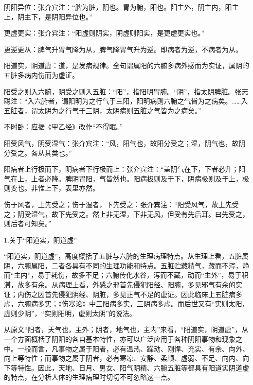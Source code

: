\documentclass[12pt]{ctexbook}
\begin{document}

\begin{jiaozhu}
	\item 阴阳异位：张介宾注：“脾为脏，阴也。胃为腑，阳也。阳主外，阴主内，阳主上，阴主下，是阴阳异位也。”
	\item 更虚更实：张介宾注：“阳虚则阴实，阴虚则阳实，是更虚更实也。”
	\item 更逆更从：脾气升胃气降为从，脾气降胃气升为逆。即病者为逆，不病者为从。
	\item 阳道实，阴道虚：道，是发病规律。全句谓属阳的六腑多病外感而为实证，属阴的五脏多病内伤而为虚证。
	\item 阳受之则入六腑，阴受之则入五脏：“阳”，指阳明胃腑。“阴”，指太阴脾脏。张志聪注：“入六腑者，谓阳明为之行气于三阳，阳明病则六腑之气皆为之病矣。……入五脏者，谓太阴为之行气于三阴，太阴病则五脏之气皆为之病矣。”
	\item 不时卧：应据《甲乙经》改作“不得眠。”
	\item 阳受风气，阴受湿气：张介宾注：“风，阳气也，故阳分受之；湿，阴气也，故阴分受之。各从其类也。”
	\item 阳病者上行极而下，阴病者下行极而上：张介宾注：“盖阴气在下，下者必升；阳气在上，上者必降。脾阴胃阳，气皆然也。阳病极则及于下，阴病极则及于上，极则变也。非惟上下，表里亦然。
	\item 伤于风者，上先受之；伤于湿者，下先受之：张介宾注：“阳受风气，故上先受之；阴受湿气，故下先受之。然上非无湿，下非无风，但受有先后耳。曰先受之，则后者可知矣。”
\end{jiaozhu}


1.关于“阳道实，阴道虚”

“阳道实，阴道虚”，高度概括了五脏与六腑的生理病理特点。从生理上看，五脏属阴，六腑属阳，二者各具有不同的生理功能和特点。五脏贮藏精气，藏而不泻，静而“主内”，易于耗伤，故多不足；六腑传化水谷，泻而不藏，动而“主外”，易于积滞，故多有余。从病理上看，外感之邪首先侵犯阳经、阳腑，多见邪气有余的实证；内伤之因首先侵犯阴经、阴脏，多见正气不足的虚证。因此临床上五脏病多虚，六腑病多实；《伤寒论》中三阳病多实，三阴病多虚。而后世又有“实则太阳，虚则少阴”，“实则阳明，虚则太阴”的说法。

从原文“阳者，天气也，主外；阴者，地气也，主内”来看，“阳道实，阴道虚”，从一个方面概栝了阴阳的各自基本特性，亦可以广泛应用于各种阴阳事物和现象之中。一般而言，凡事物之属于阳者，必有温热、躁动、刚悍、充实、有余、向外、向上等特性；而事物之属于阴者，必有寒凉、安静、柔顺、虚弱、不足、向内、向下等特性。因此，天地、日月、男女、阳气阴精、六腑五脏等都具有阳道实阴道虚的特点，在分析人体的生理病理时切切不可忽略这一点。
\end{document}
